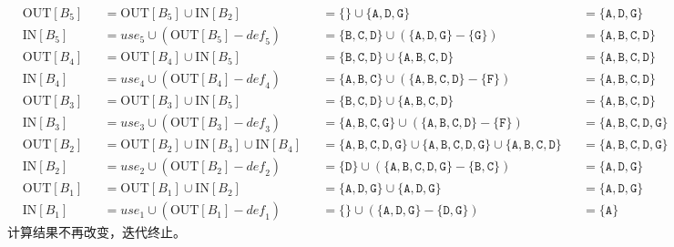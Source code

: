\documentclass{article}
\begin{document}
\begin{align*}
    & \text{OUT}[B_5] &&= \text{OUT}[B_5] \cup \text{IN}[B_2]    &&= \{  \} \cup \{\texttt{A},\texttt{D},\texttt{G}\} &&= \{\texttt{A},\texttt{D},\texttt{G}\} \\
    & \text{IN}[B_5]  &&= \textit{use}_5 \cup ( \text{OUT}[B_5] - \textit{def}_5 ) &&= \{\texttt{B},\texttt{C},\texttt{D}\} \cup ( \{\texttt{A},\texttt{D},\texttt{G}\} - \{\texttt{G}\} ) &&= \{\texttt{A},\texttt{B},\texttt{C},\texttt{D}\} \\
    & \text{OUT}[B_4] &&= \text{OUT}[B_4] \cup \text{IN}[B_5]    &&= \{\texttt{B},\texttt{C},\texttt{D}\} \cup \{\texttt{A},\texttt{B},\texttt{C},\texttt{D}\} &&= \{\texttt{A},\texttt{B},\texttt{C},\texttt{D}\} \\
    & \text{IN}[B_4]  &&= \textit{use}_4 \cup ( \text{OUT}[B_4] - \textit{def}_4 ) &&= \{\texttt{A},\texttt{B},\texttt{C}\} \cup ( \{\texttt{A},\texttt{B},\texttt{C},\texttt{D}\} - \{\texttt{F}\} ) &&= \{\texttt{A},\texttt{B},\texttt{C},\texttt{D}\} \\
    & \text{OUT}[B_3] &&= \text{OUT}[B_3] \cup \text{IN}[B_5]    &&= \{\texttt{B},\texttt{C},\texttt{D}\} \cup \{\texttt{A},\texttt{B},\texttt{C},\texttt{D}\} &&= \{\texttt{A},\texttt{B},\texttt{C},\texttt{D}\} \\
    & \text{IN}[B_3]  &&= \textit{use}_3 \cup ( \text{OUT}[B_3] - \textit{def}_3 ) &&= \{\texttt{A},\texttt{B},\texttt{C},\texttt{G}\} \cup ( \{\texttt{A},\texttt{B},\texttt{C},\texttt{D}\} - \{\texttt{F}\} ) &&= \{\texttt{A},\texttt{B},\texttt{C},\texttt{D},\texttt{G}\} \\
    & \text{OUT}[B_2] &&= \text{OUT}[B_2] \cup \text{IN}[B_3] \cup \text{IN}[B_4]    &&= \{\texttt{A},\texttt{B},\texttt{C},\texttt{D},\texttt{G}\} \cup \{\texttt{A},\texttt{B},\texttt{C},\texttt{D},\texttt{G}\} \cup \{\texttt{A},\texttt{B},\texttt{C},\texttt{D}\} &&= \{\texttt{A},\texttt{B},\texttt{C},\texttt{D},\texttt{G}\} \\
    & \text{IN}[B_2]  &&= \textit{use}_2 \cup ( \text{OUT}[B_2] - \textit{def}_2 ) &&= \{\texttt{D}\} \cup ( \{\texttt{A},\texttt{B},\texttt{C},\texttt{D},\texttt{G}\} - \{\texttt{B},\texttt{C}\} ) &&= \{\texttt{A},\texttt{D},\texttt{G}\} \\
    & \text{OUT}[B_1] &&= \text{OUT}[B_1] \cup \text{IN}[B_2]    &&= \{\texttt{A},\texttt{D},\texttt{G}\} \cup \{\texttt{A},\texttt{D},\texttt{G}\} &&= \{\texttt{A},\texttt{D},\texttt{G}\} \\
    & \text{IN}[B_1]  &&= \textit{use}_1 \cup ( \text{OUT}[B_1] - \textit{def}_1 ) &&= \{  \} \cup ( \{\texttt{A},\texttt{D},\texttt{G}\} - \{\texttt{D},\texttt{G}\} ) &&= \{ \texttt{A} \}
\end{align*}
计算结果不再改变，迭代终止。
\end{document}
